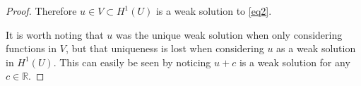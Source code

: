 \documentclass[a4paper]{article}
\newcommand{\R}{\mathbb{R}}
\begin{document}
\begin{enumerate}
\begin{proof}
      Therefore $u \in V \subset H^1(U)$ is a weak solution to \eqref{eq2}.

      It is worth noting that $u$ was the unique weak solution when only considering functions in $V$, but that uniqueness is lost when considering $u$ as a weak solution in $H^1(U)$. This can easily be seen by noticing $u+c$ is a weak solution for any $c \in \R$.

    \end{proof}

\end{enumerate}
\end{document}
